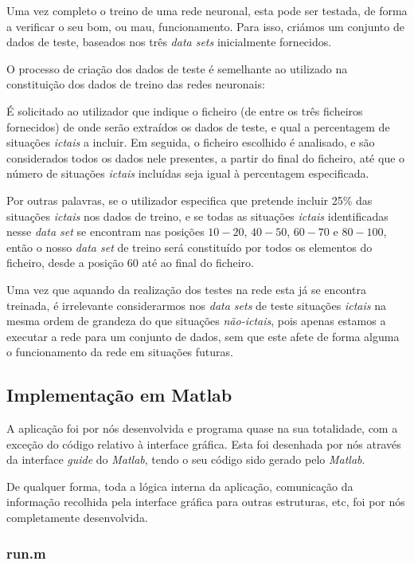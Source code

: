 \documentclass{article}
\begin{document}
Uma vez completo o treino de uma rede neuronal, esta pode ser testada, de forma a verificar o seu bom, ou mau, funcionamento. Para isso, criámos um conjunto de dados de teste, baseados nos três \emph{data sets} inicialmente fornecidos.

O processo de criação dos dados de teste é semelhante ao utilizado na constituição dos dados de treino das redes neuronais:

É solicitado ao utilizador que indique o ficheiro (de entre os três ficheiros fornecidos) de onde serão extraídos os dados de teste, e qual a percentagem de situações \emph{ictais} a incluir. Em seguida, o ficheiro escolhido é analisado, e são considerados todos os dados nele presentes, a partir do final do ficheiro, até que o número de situações \emph{ictais} incluídas seja igual à percentagem especificada.

Por outras palavras, se o utilizador especifica que pretende incluir 25\% das situações \emph{ictais} nos dados de treino, e se todas as situações \emph{ictais} identificadas nesse \emph{data set} se encontram nas posições $10-20$, $40-50$, $60-70$ e $80-100$, então o nosso \emph{data set} de treino será constituído por todos os elementos do ficheiro, desde a posição $60$ até ao final do ficheiro.

Uma vez que aquando da realização dos testes na rede esta já se encontra treinada, é irrelevante considerarmos nos \emph{data sets} de teste situações \emph{ictais} na mesma ordem de grandeza do que situações \emph{não-ictais}, pois apenas estamos a executar a rede para um conjunto de dados, sem que este afete de forma alguma o funcionamento da rede em situações futuras.

\subsection{Implementação em Matlab}

A aplicação foi por nós desenvolvida e programa quase na sua totalidade, com a exceção do código relativo à interface gráfica. Esta foi desenhada por nós através da interface \emph{guide} do \emph{Matlab}, tendo o seu código sido gerado pelo \emph{Matlab}.

De qualquer forma, toda a lógica interna da aplicação, comunicação da informação recolhida pela interface gráfica para outras estruturas, etc, foi por nós completamente desenvolvida.

\subsubsection{run.m}
\end{document}
